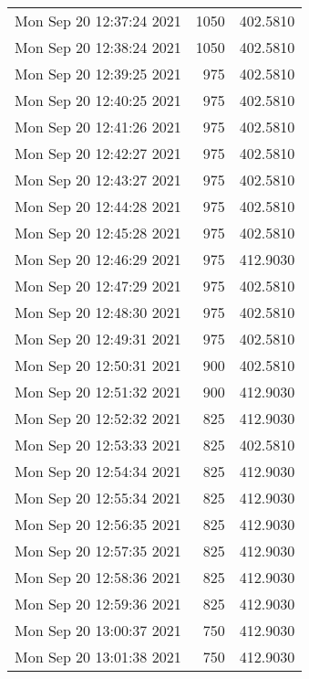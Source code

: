 \begin{longtable}{lrr}
Mon Sep 20 12:37:24 2021 &               1050 &        402.5810 \\
Mon Sep 20 12:38:24 2021 &               1050 &        402.5810 \\
Mon Sep 20 12:39:25 2021 &                975 &        402.5810 \\
Mon Sep 20 12:40:25 2021 &                975 &        402.5810 \\
Mon Sep 20 12:41:26 2021 &                975 &        402.5810 \\
Mon Sep 20 12:42:27 2021 &                975 &        402.5810 \\
Mon Sep 20 12:43:27 2021 &                975 &        402.5810 \\
Mon Sep 20 12:44:28 2021 &                975 &        402.5810 \\
Mon Sep 20 12:45:28 2021 &                975 &        402.5810 \\
Mon Sep 20 12:46:29 2021 &                975 &        412.9030 \\
Mon Sep 20 12:47:29 2021 &                975 &        402.5810 \\
Mon Sep 20 12:48:30 2021 &                975 &        402.5810 \\
Mon Sep 20 12:49:31 2021 &                975 &        402.5810 \\
Mon Sep 20 12:50:31 2021 &                900 &        402.5810 \\
Mon Sep 20 12:51:32 2021 &                900 &        412.9030 \\
Mon Sep 20 12:52:32 2021 &                825 &        412.9030 \\
Mon Sep 20 12:53:33 2021 &                825 &        402.5810 \\
Mon Sep 20 12:54:34 2021 &                825 &        412.9030 \\
Mon Sep 20 12:55:34 2021 &                825 &        412.9030 \\
Mon Sep 20 12:56:35 2021 &                825 &        412.9030 \\
Mon Sep 20 12:57:35 2021 &                825 &        412.9030 \\
Mon Sep 20 12:58:36 2021 &                825 &        412.9030 \\
Mon Sep 20 12:59:36 2021 &                825 &        412.9030 \\
Mon Sep 20 13:00:37 2021 &                750 &        412.9030 \\
Mon Sep 20 13:01:38 2021 &                750 &        412.9030 \\

\end{longtable}
